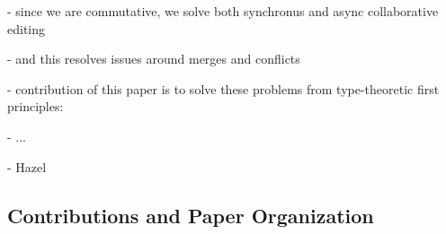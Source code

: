 - since we are commutative, we solve both synchronus and async collaborative editing

- and this resolves issues around merges and conflicts

- contribution of this paper is to solve these problems from type-theoretic first principles:

- ...

- Hazel

\subsection{Contributions and Paper Organization}%
\label{sec:Contributions and Paper Organization}
